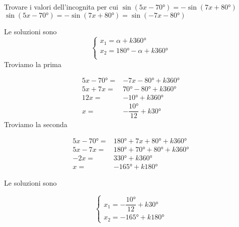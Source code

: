 \begin{exercise}
	Trovare i valori dell'incognita per cui $\sin(5x-\ang{70;;})=-\sin(7x +\ang{80;;})$
	\tcblower
$\sin(5x-\ang{70;;})=-\sin(7x +\ang{80;;})=\sin(-7x-\ang{80;;})$
	
	Le soluzioni sono 
	\[\begin{cases}
	x_1=\alpha+k\ang{360;;}\\
	x_2=\ang{180;;}-\alpha+k\ang{360;;}\\
	\end{cases}\]
	Troviamo la prima
	
	\begin{align*}
		5x-\ang{70;;}=&-7x-\ang{80;;}+k\ang{360;;}\\
		5x+7x=&\ang{70;;}-\ang{80;;}+k\ang{360;;}\\
		12x=&-\ang{10;;}+k\ang{360;;}\\
		x=&-\dfrac{\ang{10;;}}{12}+k\ang{30;;}
	\end{align*}
	Troviamo la seconda
	
	\begin{align*}
		5x-\ang{70;;}=&\ang{180;;}+7x+\ang{80;;}+k\ang{360;;}\\
		5x-7x=&\ang{180;;}+\ang{70;;}+\ang{80;;}+k\ang{360;;}\\
		-2x=&\ang{330;;}+k\ang{360;;}\\
		x=&-\ang{165;;}+k\ang{180;;}
	\end{align*}
	
	Le soluzioni sono
	
	\[\begin{cases}
	x_1=-\dfrac{\ang{10;;}}{12}+k\ang{30;;}\\
	x_2=-\ang{165;;}+k\ang{180;;}
	\end{cases}\]
\end{exercise}
